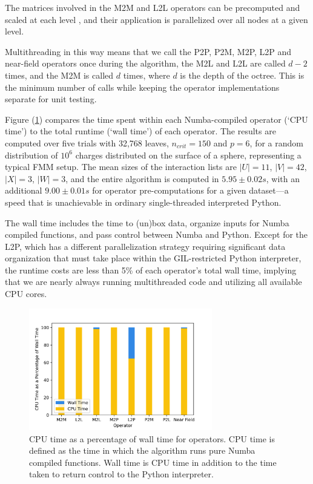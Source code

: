 \documentclass{IEEEcsmag}
\begin{document}
The matrices involved in the M2M and L2L operators can be precomputed and scaled at each level \cite{Wang2021}, and their application is parallelized over all nodes at a given level.

Multithreading in this way means that we call the P2P, P2M, M2P, L2P and near-field operators once during the algorithm, the M2L and L2L are called $d-2$ times, and the M2M is called $d$ times, where $d$ is the depth of the octree. This is the minimum number of calls while keeping the operator implementations separate for unit testing.

Figure (\ref{fig:cpu_wall}) compares the time spent within each Numba-compiled operator (`CPU time') to the total runtime (`wall time') of each operator. The results are computed over five trials with 32,768 leaves,  $n_{crit}=150$ and $p=6$, for a random distribution of $10^6$ charges distributed on the surface of a sphere, representing a typical FMM setup. The mean sizes of the interaction lists are $|U|=11$, $|V|=42$, $|X|=3$, $|W|=3$, and the entire algorithm is computed in $5.95 \pm 0.02 s$, with an additional $9.00 \pm 0.01 s$ for operator pre-computations for a given dataset---a speed that is unachievable in ordinary single-threaded interpreted Python.

The wall time includes the time to (un)box data, organize inputs for Numba compiled functions, and pass control between Numba and Python. Except for the L2P, which has a different parallelization strategy  requiring significant data organization that must take place within the GIL-restricted Python interpreter, the runtime costs are less than 5\% of each operator's total wall time, implying that we are nearly always running multithreaded code and utilizing all available CPU cores. 

 \begin{figure}
	\centerline{\includegraphics[width=8cm]{figures/cpu_wall.png}}
    \caption{CPU time as a percentage of wall time for operators. CPU time is defined as the time in which the algorithm runs pure Numba compiled functions. Wall time is CPU time in addition to the time taken to return control to the Python interpreter. } 
	\label{fig:cpu_wall}
\end{figure}
\end{document}
